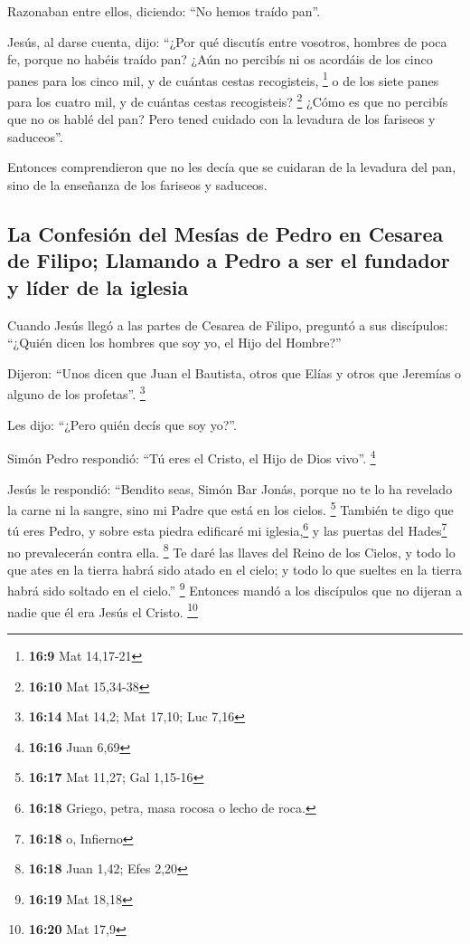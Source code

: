  Razonaban entre ellos, diciendo: ``No hemos traído pan''.

 Jesús, al darse cuenta, dijo: ``¿Por qué discutís entre
vosotros, hombres de poca fe, porque no habéis traído pan?
 ¿Aún no percibís ni os acordáis de los cinco panes para
los cinco mil, y de cuántas cestas recogisteis, \footnote{\textbf{16:9}
  Mat 14,17-21}  o de los siete panes para los cuatro
mil, y de cuántas cestas recogisteis? \footnote{\textbf{16:10} Mat
  15,34-38}  ¿Cómo es que no percibís que no os hablé del
pan? Pero tened cuidado con la levadura de los fariseos y saduceos''.

 Entonces comprendieron que no les decía que se cuidaran
de la levadura del pan, sino de la enseñanza de los fariseos y saduceos.

\hypertarget{la-confesiuxf3n-del-mesuxedas-de-pedro-en-cesarea-de-filipo-llamando-a-pedro-a-ser-el-fundador-y-luxedder-de-la-iglesia}{%
\subsection{La Confesión del Mesías de Pedro en Cesarea de Filipo;
Llamando a Pedro a ser el fundador y líder de la
iglesia}\label{la-confesiuxf3n-del-mesuxedas-de-pedro-en-cesarea-de-filipo-llamando-a-pedro-a-ser-el-fundador-y-luxedder-de-la-iglesia}}

 Cuando Jesús llegó a las partes de Cesarea de Filipo,
preguntó a sus discípulos: ``¿Quién dicen los hombres que soy yo, el
Hijo del Hombre?''

 Dijeron: ``Unos dicen que Juan el Bautista, otros que
Elías y otros que Jeremías o alguno de los profetas''. \footnote{\textbf{16:14}
  Mat 14,2; Mat 17,10; Luc 7,16}

 Les dijo: ``¿Pero quién decís que soy yo?''.

 Simón Pedro respondió: ``Tú eres el Cristo, el Hijo de
Dios vivo''. \footnote{\textbf{16:16} Juan 6,69}

 Jesús le respondió: ``Bendito seas, Simón Bar Jonás,
porque no te lo ha revelado la carne ni la sangre, sino mi Padre que
está en los cielos. \footnote{\textbf{16:17} Mat 11,27; Gal 1,15-16}
 También te digo que tú eres Pedro, y sobre esta piedra
edificaré mi iglesia,\footnote{\textbf{16:18} Griego, petra, masa rocosa
  o lecho de roca.} y las puertas del Hades\footnote{\textbf{16:18} o,
  Infierno} no prevalecerán contra ella. \footnote{\textbf{16:18} Juan
  1,42; Efes 2,20}  Te daré las llaves del Reino de los
Cielos, y todo lo que ates en la tierra habrá sido atado en el cielo; y
todo lo que sueltes en la tierra habrá sido soltado en el cielo.''
\footnote{\textbf{16:19} Mat 18,18}  Entonces mandó a los
discípulos que no dijeran a nadie que él era Jesús el Cristo.
\footnote{\textbf{16:20} Mat 17,9}

